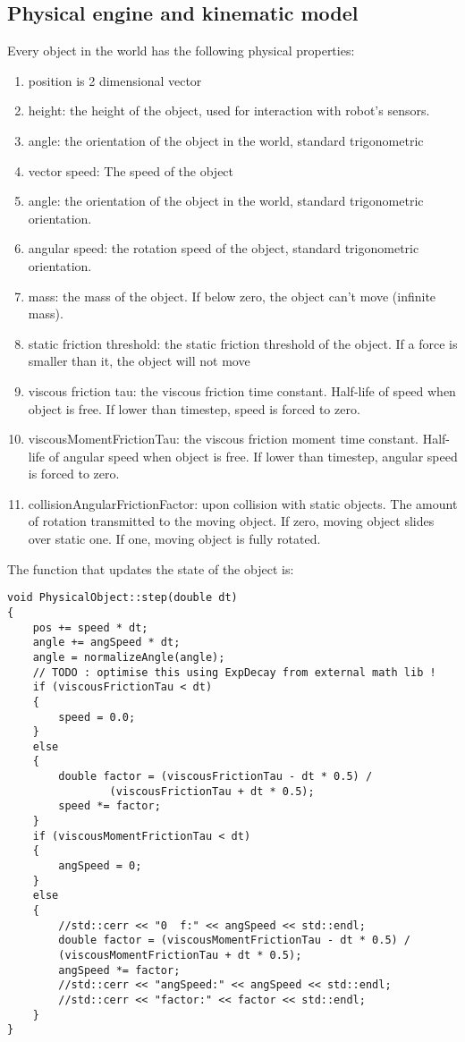\subsection{Physical engine and kinematic model}
Every object in the world has the following physical properties:
\begin{enumerate}
\item position is 2 dimensional vector
\item height: the height of the object, used for interaction with robot's sensors.
\item angle: the orientation of the object in the world, standard trigonometric
\item vector speed: The speed of the object
\item angle:  the orientation of the object in the world, standard trigonometric orientation.
\item angular speed: the rotation speed of the object, standard trigonometric orientation.
\item mass: the mass of the object. If below zero, the object can't move (infinite mass).
\item static friction threshold: the static friction threshold of the object.
If a force is smaller than it, the object will not move
\item viscous friction tau: the viscous friction time constant.
Half-life of speed when object is free. If lower than timestep, speed is forced to zero.
\item viscousMomentFrictionTau: the viscous friction moment time constant.
Half-life of angular speed when object is free. If lower than timestep, angular speed is forced to zero.
\item collisionAngularFrictionFactor: upon collision with static objects.
The amount of rotation transmitted to the moving object. If zero, moving object slides over static one. If one, moving object is fully rotated.
\end{enumerate}

The function that updates the state of the object is:
\small{
\begin{lstlisting}
void PhysicalObject::step(double dt)
{
	pos += speed * dt;
	angle += angSpeed * dt;
	angle = normalizeAngle(angle);
	// TODO : optimise this using ExpDecay from external math lib !
	if (viscousFrictionTau < dt)
	{
		speed = 0.0;
	}
	else
	{
		double factor = (viscousFrictionTau - dt * 0.5) /
				(viscousFrictionTau + dt * 0.5);
		speed *= factor;	
	}
	if (viscousMomentFrictionTau < dt)
	{
		angSpeed = 0;
	}
	else
	{
		//std::cerr << "0  f:" << angSpeed << std::endl;
		double factor = (viscousMomentFrictionTau - dt * 0.5) /
		(viscousMomentFrictionTau + dt * 0.5);
		angSpeed *= factor;
		//std::cerr << "angSpeed:" << angSpeed << std::endl;
		//std::cerr << "factor:" << factor << std::endl;
	}
}
\end{lstlisting}
}


